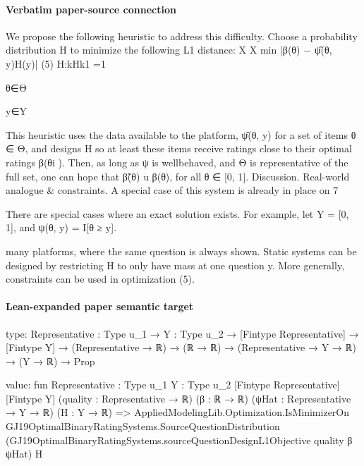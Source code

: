 \documentclass[10pt]{article}
\begin{document}
\paragraph{Verbatim paper-source connection}
\begin{ReviewVerbatim}
We propose the following heuristic to address this
difficulty. Choose a probability distribution H to
minimize the following L1 distance:
X
X
min
|β(θ) −
ψ̂(θ, y)H(y)|
(5)
H:kHk1 =1

θ∈Θ

y∈Y

This heuristic uses the data available to the platform, ψ̂(θ, y) for a set of items θ ∈ Θ, and designs H
so at least these items receive ratings close to their
optimal ratings β(θi ). Then, as long as ψ is wellbehaved, and Θ is representative of the full set, one
can hope that β̃(θ) u β(θ), for all θ ∈ [0, 1].
Discussion. Real-world analogue & constraints. A
special case of this system is already in place on
7

There are special cases where an exact solution exists. For example, let Y = [0, 1], and ψ(θ, y) = I[θ ≥ y].

many platforms, where the same question is always
shown. Static systems can be designed by restricting
H to only have mass at one question y. More generally, constraints can be used in optimization (5).
\end{ReviewVerbatim}



\paragraph{Lean-expanded paper semantic target}
\begin{ReviewVerbatim}
type:
{Representative : Type u_1} →
  {Y : Type u_2} →
    [Fintype Representative] → [Fintype Y] → (Representative → ℝ) → (ℝ → ℝ) → (Representative → Y → ℝ) → (Y → ℝ) → Prop

value:
fun {Representative : Type u_1} {Y : Type u_2} [Fintype Representative] [Fintype Y] (quality : Representative → ℝ)
    (β : ℝ → ℝ) (ψHat : Representative → Y → ℝ) (H : Y → ℝ) =>
  AppliedModelingLib.Optimization.IsMinimizerOn GJ19OptimalBinaryRatingSystems.SourceQuestionDistribution
    (GJ19OptimalBinaryRatingSystems.sourceQuestionDesignL1Objective quality β ψHat) H
\end{ReviewVerbatim}
\end{document}
